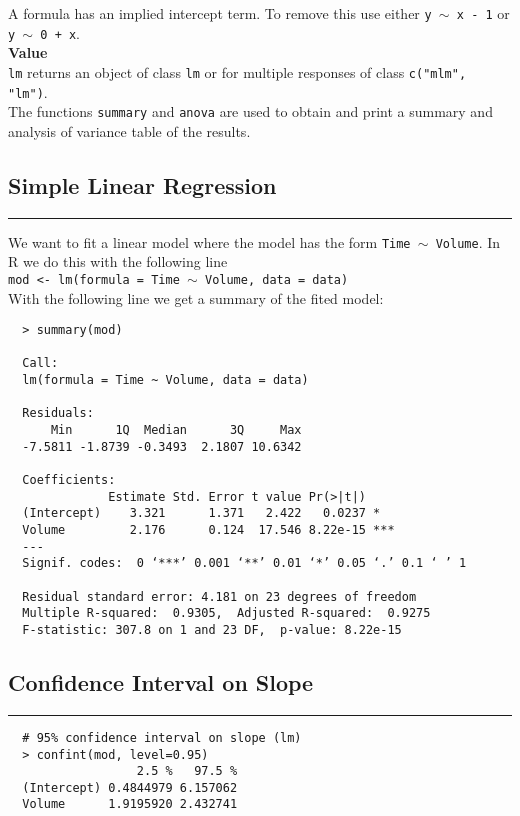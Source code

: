 A formula has an implied intercept term. To remove this use either \texttt{y $\sim$ x - 1} or \texttt{y $\sim$ 0 + x}.\\

\textbf{Value}\\
\texttt{lm} returns an object of class \texttt{lm} or for multiple responses of class \texttt{c("mlm", "lm")}.\\

The functions \texttt{summary} and \texttt{anova} are used to obtain and print a summary and analysis of variance table of the results.\\

\subsection{Simple Linear Regression}
\noindent\rule[\linienAbstand]{\linewidth}{\linienDicke}
We want to fit a linear model where the model has the form \texttt{Time $\sim$ Volume}. In R we do this with the following line\\
\texttt{mod <- lm(formula = Time $\sim$ Volume, data = data)}\\

With the following line we get a summary of the fited model:\\
\begingroup
\scriptsize
\begin{verbatim}
  > summary(mod)

  Call:
  lm(formula = Time ~ Volume, data = data)

  Residuals:
      Min      1Q  Median      3Q     Max
  -7.5811 -1.8739 -0.3493  2.1807 10.6342

  Coefficients:
              Estimate Std. Error t value Pr(>|t|)
  (Intercept)    3.321      1.371   2.422   0.0237 *
  Volume         2.176      0.124  17.546 8.22e-15 ***
  ---
  Signif. codes:  0 ‘***’ 0.001 ‘**’ 0.01 ‘*’ 0.05 ‘.’ 0.1 ‘ ’ 1

  Residual standard error: 4.181 on 23 degrees of freedom
  Multiple R-squared:  0.9305,	Adjusted R-squared:  0.9275
  F-statistic: 307.8 on 1 and 23 DF,  p-value: 8.22e-15
\end{verbatim}
\endgroup
\vspace{\baselineskip}

\subsection{Confidence Interval on Slope}
\noindent\rule[\linienAbstand]{\linewidth}{\linienDicke}
\begingroup
\scriptsize
\begin{verbatim}
  # 95% confidence interval on slope (lm)
  > confint(mod, level=0.95)
                  2.5 %   97.5 %
  (Intercept) 0.4844979 6.157062
  Volume      1.9195920 2.432741
\end{verbatim}
\endgroup
\vspace{\baselineskip}

